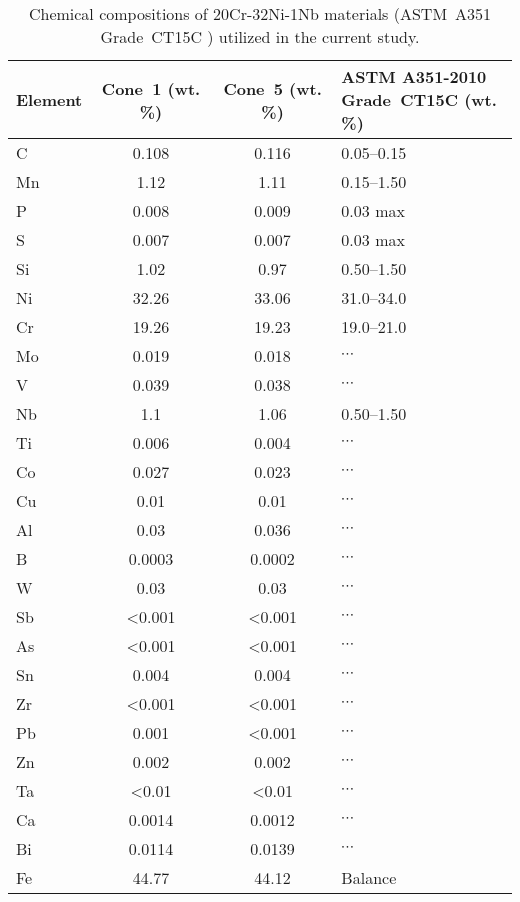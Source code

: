 \begin{table}
\caption{Chemical compositions of 20Cr-32Ni-1Nb materials (ASTM~A351 Grade~CT15C \cite{astm_a351_2010}) utilized in the current study.}
\begin{tabular}{l c c C{2in}}
\toprule
\textbf{Element} & \textbf{Cone~1 (wt. \%)} & \textbf{Cone~5 (wt. \%)} & \textbf{ASTM A351-2010 \newline Grade~CT15C (wt. \%)}\\
\midrule
C  & 0.108    & 0.116    & 0.05--0.15           \\
Mn & 1.12     & 1.11     & 0.15--1.50           \\
P  & 0.008    & 0.009    & 0.03 max            \\
S  & 0.007    & 0.007    & 0.03 max            \\
Si & 1.02     & 0.97     & 0.50--1.50           \\
Ni & 32.26    & 33.06    & 31.0--34.0           \\
Cr & 19.26    & 19.23    & 19.0--21.0           \\
Mo & 0.019    & 0.018    & $\cdots$                   \\
V  & 0.039    & 0.038    & $\cdots$                   \\
Nb & 1.1      & 1.06     & 0.50--1.50                  \\
Ti & 0.006    & 0.004    & $\cdots$                   \\
Co & 0.027    & 0.023    & $\cdots$           \\
Cu & 0.01     & 0.01     & $\cdots$                   \\
Al & 0.03     & 0.036    & $\cdots$                   \\
B  & 0.0003   & 0.0002   & $\cdots$                   \\
W  & 0.03     & 0.03     & $\cdots$                   \\
Sb & <0.001   & <0.001   & $\cdots$                   \\
As & <0.001   & <0.001   & $\cdots$                   \\
Sn & 0.004    & 0.004    & $\cdots$                   \\
Zr & <0.001   & <0.001   & $\cdots$                   \\
Pb & 0.001    & <0.001   & $\cdots$                   \\
Zn & 0.002    & 0.002    & $\cdots$                   \\
Ta & <0.01    & <0.01    & $\cdots$                   \\
Ca & 0.0014   & 0.0012   & $\cdots$                   \\
Bi & 0.0114   & 0.0139   & $\cdots$                   \\
Fe & 44.77    & 44.12    & Balance             \\
\bottomrule
\end{tabular}
\label{tab:ct15c-chemistry}
\end{table}